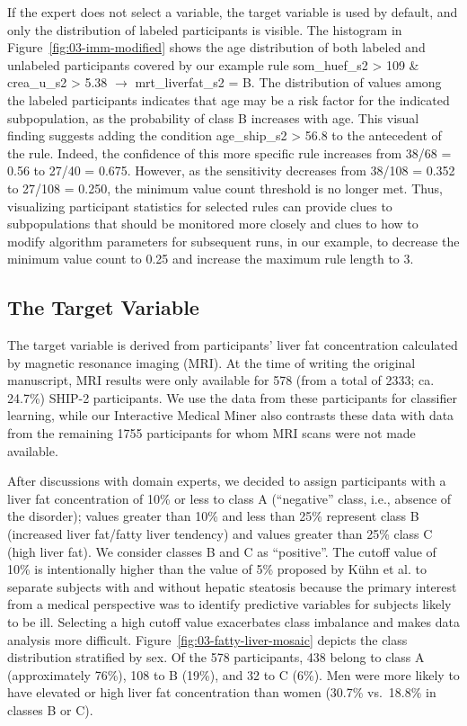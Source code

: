 \documentclass[
  oneside]{book}
\begin{document}
If the expert does not select a variable, the target variable is used by default, and only the distribution of labeled participants is visible.
The histogram in Figure~\ref{fig:03-imm-modified} shows the age distribution of both labeled and unlabeled participants covered by our example rule som\_huef\_s2 \textgreater{} 109 \& crea\_u\_s2 \textgreater{} 5.38 \(\longrightarrow\) mrt\_liverfat\_s2 = B.
The distribution of values among the labeled participants indicates that age may be a risk factor for the indicated subpopulation, as the probability of class B increases with age.
This visual finding suggests adding the condition age\_ship\_s2 \textgreater{} 56.8 to the antecedent of the rule.
Indeed, the confidence of this more specific rule increases from 38/68 = 0.56 to 27/40 = 0.675.
However, as the sensitivity decreases from 38/108 = 0.352 to 27/108 = 0.250, the minimum value count threshold is no longer met.
Thus, visualizing participant statistics for selected rules can provide clues to subpopulations that should be monitored more closely and clues to how to modify algorithm parameters for subsequent runs, in our example, to decrease the minimum value count to 0.25 and increase the maximum rule length to 3.

\hypertarget{imm-workflow-target}{%
\subsection{The Target Variable}\label{imm-workflow-target}}

The target variable is derived from participants' liver fat concentration calculated by magnetic resonance imaging (MRI).
At the time of writing the original manuscript, MRI results were only available for 578 (from a total of 2333; ca. 24.7\%) SHIP-2 participants.
We use the data from these participants for classifier learning, while our Interactive Medical Miner also contrasts these data with data from the remaining 1755 participants for whom MRI scans were not made available.

After discussions with domain experts, we decided to assign participants with a liver fat concentration of 10\% or less to class A (``negative'' class, i.e., absence of the disorder); values greater than 10\% and less than 25\% represent class B (increased liver fat/fatty liver tendency) and values greater than 25\% class C (high liver fat).
We consider classes B and C as ``positive''.
The cutoff value of 10\% is intentionally higher than the value of 5\% proposed by Kühn et al. \autocite{KuehnEtAl:2011} to separate subjects with and without hepatic steatosis because the primary interest from a medical perspective was to identify predictive variables for subjects likely to be ill.
Selecting a high cutoff value exacerbates class imbalance and makes data analysis more difficult.
Figure~\ref{fig:03-fatty-liver-mosaic} depicts the class distribution stratified by sex.
Of the 578 participants, 438 belong to class A (approximately 76\%), 108 to B (19\%), and 32 to C (6\%).
Men were more likely to have elevated or high liver fat concentration than women (30.7\% vs.~18.8\% in classes B or C).
\end{document}
